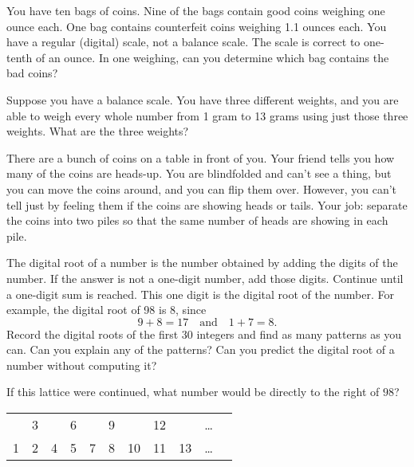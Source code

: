 \begin{problem}
You have ten bags of coins.  Nine of the bags contain good coins weighing one ounce each.  One bag contains counterfeit coins weighing 1.1 ounces each.  You have a regular (digital) scale, not a balance scale.  The scale is correct to one-tenth of an ounce.  In one weighing, can you determine which bag contains the bad coins?
\end{problem}

\begin{problem}
Suppose you have a balance scale.  You have three different weights, and you are able to weigh every whole number from 1 gram to 13 grams using just those three weights.  What are the three weights?  
\end{problem}



\begin{problem}
There are a bunch of coins on a table in front of you.  Your friend tells you how many of the coins are heads-up.  You are blindfolded and can't see a thing, but you can move the coins around, and you can flip them over.  However, you can't tell just by feeling them if the coins are showing heads or tails.  Your job: separate the coins into two piles so that the same number of heads are showing in each pile.
\end{problem}


\begin{problem}
The digital root of a number is the number obtained by adding the digits of the number.  If the answer is not a one-digit number, add those digits.  Continue until a one-digit sum is reached.  This one digit is the digital root of the number.  For example, the digital root of 98 is 8, since 
$$
9+8 = 17 \quad \text{and} \quad 1+7 = 8.
$$
Record the digital roots of the first $30$ integers and find as many  patterns as you can.  Can you explain any of the patterns?  Can you predict the digital root of a number without computing it? 
\end{problem}

\begin{problem}
If this lattice were continued, what number would be directly to the right of $98$?
\begin{center}
\begin{tabular}{c c c c c c c c c c c}
& 3 &  & 6 &  & 9 &  & 12 & &\ldots \\
1 & 2& 4&  5 & 7 & 8 & 10 & 11 & 13 & \ldots  \\
\end{tabular}
\end{center}

\end{problem}





